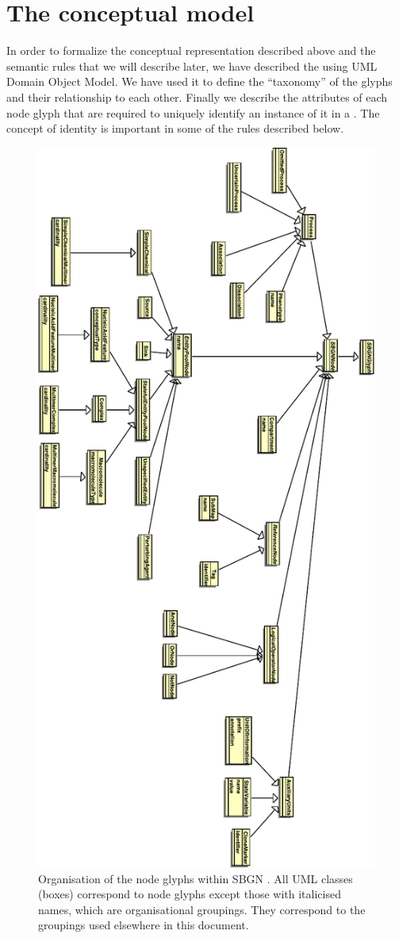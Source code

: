 \section{The conceptual model}

In order to formalize the conceptual representation described above and the semantic rules that we will describe later, we have described the \PDl using UML Domain Object Model. We have used it to define the ``taxonomy'' of the \PD glyphs and their relationship to each other. Finally we describe the attributes of each node glyph that are required to uniquely identify an instance of it in a \PDm. The concept of identity is important in some of the rules described below.

\begin{figure}[htb]
\begin{center}
\includegraphics[width=0.6\linewidth]{images/sbgn_node_taxonomy}
\caption{Organisation of the node glyphs within SBGN \PDl. All UML classes (boxes) correspond to \PD node glyphs except those with italicised names, which are organisational groupings. They correspond to the groupings used elsewhere in this document.}
\label{fig:sbgn_node_tax}
\end{center}
\end{figure}

